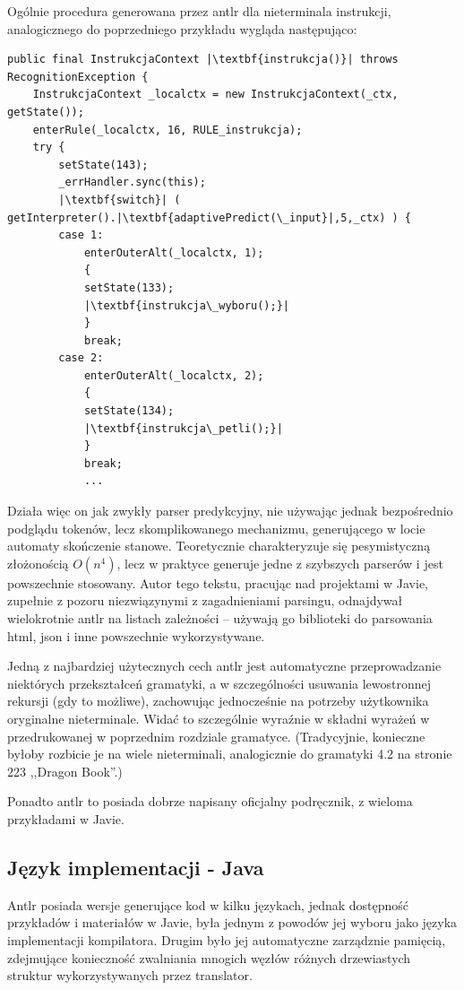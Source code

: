 Ogólnie procedura generowana przez antlr dla nieterminala instrukcji, analogicznego do poprzedniego przykładu wygląda następująco:
\lstset{
    escapechar=|,
    breaklines=true
}
\begin{lstlisting}
public final InstrukcjaContext |\textbf{instrukcja()}| throws RecognitionException {
    InstrukcjaContext _localctx = new InstrukcjaContext(_ctx, getState());
    enterRule(_localctx, 16, RULE_instrukcja);
    try {
        setState(143);
        _errHandler.sync(this);
        |\textbf{switch}| ( getInterpreter().|\textbf{adaptivePredict(\_input}|,5,_ctx) ) {
        case 1:
            enterOuterAlt(_localctx, 1);
            {
            setState(133);
            |\textbf{instrukcja\_wyboru();}|
            }
            break;
        case 2:
            enterOuterAlt(_localctx, 2);
            {
            setState(134);
            |\textbf{instrukcja\_petli();}|
            }
            break;
            ...
\end{lstlisting}
Działa więc on jak zwykły parser predykcyjny, nie używając jednak bezpośrednio podglądu tokenów, lecz skomplikowanego mechanizmu, generującego w locie automaty skończenie stanowe\cite{PARR_2014}. Teoretycznie charakteryzuje się pesymistyczną złożonością $O(n^4)$, lecz w praktyce generuje jedne z szybszych parserów i jest powszechnie stosowany. Autor tego tekstu, pracując nad projektami w Javie, zupełnie z pozoru niezwiązynymi z zagadnieniami parsingu, odnajdywał wielokrotnie antlr na listach zależności – używają go biblioteki do parsowania html, json i inne powszechnie wykorzystywane.

Jedną z najbardziej użytecznych cech antlr jest automatyczne przeprowadzanie niektórych przekształceń gramatyki, a w szczególności usuwania lewostronnej rekursji (gdy to możliwe), zachowując jednocześnie na potrzeby użytkownika oryginalne nieterminale. Widać to szczególnie wyraźnie w składni wyrażeń w przedrukowanej w poprzednim rozdziale gramatyce. (Tradycyjnie, konieczne byłoby rozbicie je na wiele nieterminali, analogicznie do gramatyki 4.2 na stronie 223 ,,Dragon Book''\cite{DRAGON_BOOK}.)

Ponadto antlr to posiada dobrze napisany oficjalny podręcznik\cite{Definitive_antlr_reference}, z wieloma przykładami w Javie. 

\subsection{Język implementacji - Java}
Antlr posiada wersje generujące kod w kilku językach, jednak dostępność przykładów i materiałów w Javie, była jednym z powodów jej wyboru jako języka implementacji kompilatora. Drugim było jej automatyczne zarządznie pamięcią, zdejmujące konieczność zwalniania mnogich węzłów różnych drzewiastych struktur wykorzystywanych przez translator. 

